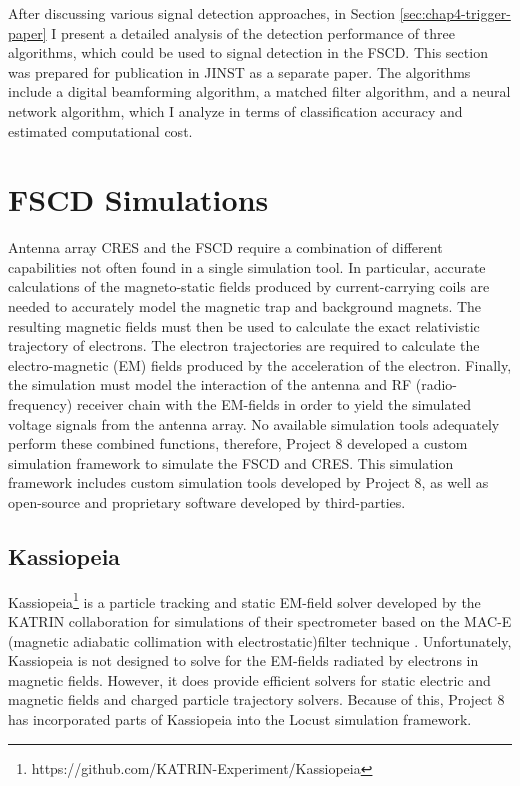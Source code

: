 After discussing various signal detection approaches, in Section \ref{sec:chap4-trigger-paper} I present a detailed analysis of the detection performance of three algorithms, which could be used to signal detection in the FSCD. This section was prepared for publication in JINST as a separate paper. The algorithms include a digital beamforming algorithm, a matched filter algorithm, and a neural network algorithm, which I analyze in terms of classification accuracy and estimated computational cost.  

\section{FSCD Simulations}
\label{sec:chap4-simulations}

Antenna array CRES and the FSCD require a combination of different capabilities not often found in a single simulation tool. In particular, accurate calculations of the magneto-static fields produced by current-carrying coils are needed to accurately model the magnetic trap and background magnets. The resulting magnetic fields must then be used to calculate the exact relativistic trajectory of electrons. The electron trajectories are required to calculate the electro-magnetic (EM) fields produced by the acceleration of the electron. Finally, the simulation must model the interaction of the antenna and RF (radio-frequency) receiver chain with the EM-fields in order to yield the simulated voltage signals from the antenna array. No available simulation tools adequately perform these combined functions, therefore, Project 8 developed a custom simulation framework to simulate the FSCD and CRES. This simulation framework includes custom simulation tools developed by Project 8, as well as open-source and proprietary software developed by third-parties.

\subsection{Kassiopeia}

Kassiopeia\footnote{https://github.com/KATRIN-Experiment/Kassiopeia} is a particle tracking and static EM-field solver developed by the KATRIN collaboration for simulations of their spectrometer based on the MAC-E (magnetic adiabatic collimation with electrostatic)filter technique \cite{kassiopeia}. Unfortunately, Kassiopeia is not designed to solve for the EM-fields radiated by electrons in magnetic fields. However, it does provide efficient solvers for static electric and magnetic fields and charged particle trajectory solvers. Because of this, Project 8 has incorporated parts of Kassiopeia into the Locust simulation framework. 

